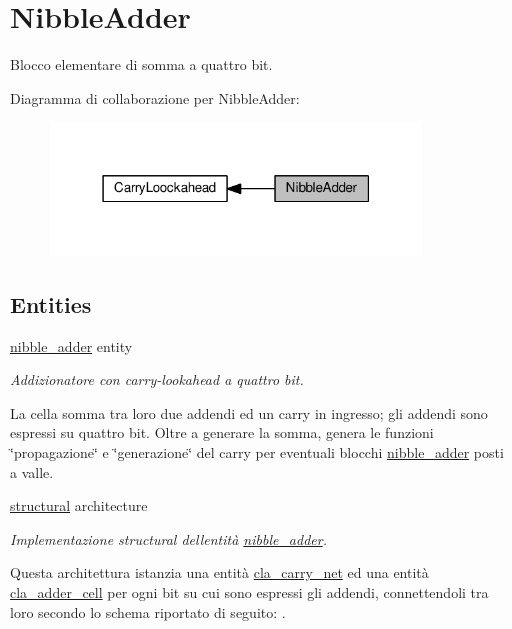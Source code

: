 \hypertarget{group___nibble_adder}{}\section{Nibble\+Adder}
\label{group___nibble_adder}


Blocco elementare di somma a quattro bit.  


Diagramma di collaborazione per Nibble\+Adder\+:\nopagebreak
\begin{figure}[H]
\begin{center}
\leavevmode
\includegraphics[width=279pt]{group___nibble_adder}
\end{center}
\end{figure}
\subsection*{Entities}
\begin{DoxyCompactItemize}
\item 
\hyperlink{classnibble__adder}{nibble\+\_\+adder} entity
\begin{DoxyCompactList}\small\item\em Addizionatore con carry-\/lookahead a quattro bit.

La cella somma tra loro due addendi ed un carry in ingresso; gli addendi sono espressi su quattro bit. Oltre a generare la somma, genera le funzioni \char`\"{}propagazione\char`\"{} e \char`\"{}generazione\char`\"{} del carry per eventuali blocchi \hyperlink{classnibble__adder}{nibble\+\_\+adder} posti a valle. \end{DoxyCompactList}\item 
\hyperlink{classnibble__adder_1_1structural}{structural} architecture
\begin{DoxyCompactList}\small\item\em Implementazione structural dell\textquotesingle{}entità \hyperlink{classnibble__adder}{nibble\+\_\+adder}.

Questa architettura istanzia una entità \hyperlink{classcla__carry__net}{cla\+\_\+carry\+\_\+net} ed una entità \hyperlink{classcla__adder__cell}{cla\+\_\+adder\+\_\+cell} per ogni bit su cui sono espressi gli addendi, connettendoli tra loro secondo lo schema riportato di seguito\+: . \end{DoxyCompactList}\end{DoxyCompactItemize}
